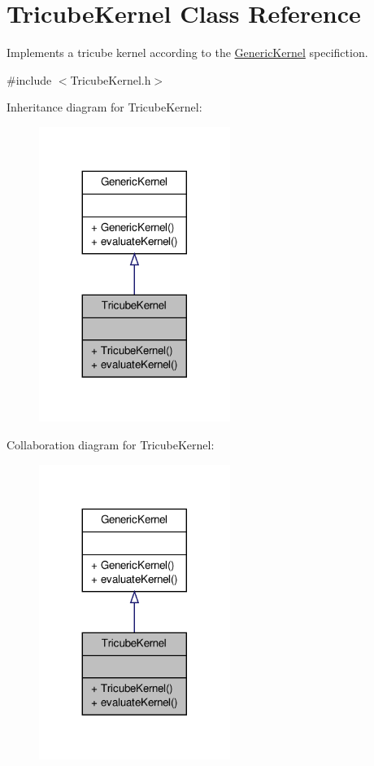 \hypertarget{classTricubeKernel}{\section{\-Tricube\-Kernel \-Class \-Reference}
\label{classTricubeKernel}
}


\-Implements a tricube kernel according to the \hyperlink{classGenericKernel}{\-Generic\-Kernel} specifiction.  




{\ttfamily \#include $<$\-Tricube\-Kernel.\-h$>$}



\-Inheritance diagram for \-Tricube\-Kernel\-:\nopagebreak
\begin{figure}[H]
\begin{center}
\leavevmode
\includegraphics[width=176pt]{classTricubeKernel__inherit__graph}
\end{center}
\end{figure}


\-Collaboration diagram for \-Tricube\-Kernel\-:\nopagebreak
\begin{figure}[H]
\begin{center}
\leavevmode
\includegraphics[width=176pt]{classTricubeKernel__coll__graph}
\end{center}
\end{figure}
